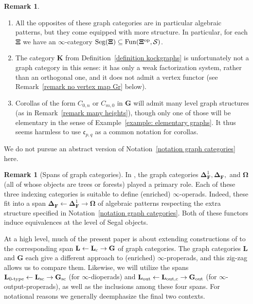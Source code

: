 \documentclass{amsart}
\numberwithin{theorem}{subsection}
\theoremstyle{definition}
\newtheorem{remark}[theorem]{Remark}
\providecommand{\op}{\mathrm{op}}
\newcommand{\xFun}{\operatorname{Fun}}
\newcommand{\finsetskel}{\mathbf{F}}
\newcommand{\xS}{\mathcal{S}}
\newcommand{\xfc}{\mathfrak{c}}
\newcommand{\icat}{$\infty$-category}
\newcommand{\name}[1]{\ensuremath{\text{\textup{#1}}}}
\newcommand{\simp}{\mathbf{\Delta}}
\newcommand{\bbO}{\mathbf{\Omega}}
\newcommand{\levelg}{\mathbf{L}}
\newcommand{\levelgconn}{\levelg_{\name{c}}}
\newcommand{\bbY}{\mathbf{G}}
\newcommand{\gc}{\mathbf{\Xi}}
\newcommand{\kockgraphs}{\mathbf{K}}
\newcommand{\Seg}{\name{Seg}}
\begin{document}
\begin{remark}\label{rem algpattvariation} \quad
	\begin{enumerate}[label=(\roman*), ref={\roman*}]
		\item All the opposites of these graph categories are in particular algebraic patterns, but they come equipped with more structure.
		In particular, for each $\gc$ we have an \icat{} $\Seg(\gc) \subseteq \xFun(\gc^\op, \xS)$. 
		\label{rem algpattvariation more structure}
	\item The category $\kockgraphs$ from Definition~\ref{definition kockgraphs} is unfortunately not a graph category in this sense: it has only a weak factorization system, rather than an orthogonal one, and it does not admit a vertex functor (see Remark~\ref{remark no vertex map Gr} below).
	\item Corollas of the form $C_{0,n}$ or $C_{m,0}$ in $\bbY$ will admit many level graph structures (as in Remark~\ref{remark many heights}), though only one of those will be elementary in the sense of Example~\ref{example: elementary graphs}.
	It thus seems harmless to use $\xfc_{p,q}$ as a common notation for corollas.
	\end{enumerate}
\end{remark}

We do not pursue an abstract version of Notation~\ref{notation graph categories} here.

\begin{remark}[Spans of graph categories]\label{remark three contexts}
In \cite{ChuHaugseng}, the graph categories $\simp_{\finsetskel}^1, \simp_{\finsetskel},$ and $\bbO$ (all of whose objects are trees or forests) played a primary role.
Each of these three indexing categories is suitable to define (enriched) $\infty$-operads.
Indeed, these fit into a span $\simp_{\finsetskel} \leftarrow \simp_{\finsetskel}^1 \rightarrow \bbO$ of algebraic patterns respecting the extra structure specified in Notation~\ref{notation graph categories}.
Both of these functors induce equivalences at the level of Segal objects.

At a high level, much of the present paper is about extending constructions of \cite{ChuHaugseng} to the corresponding span $\levelg \leftarrow \levelgconn \rightarrow \bbY$ of graph categories.
The graph categories $\levelg$ and $\bbY$ each give a different approach to (enriched) $\infty$-properads, and this zig-zag allows us to compare them.
Likewise, we will utilize the spans $\levelg_{\name{0-type}} \leftarrow \levelg_{\name{sc}} \rightarrow \bbY_{\name{sc}}$ (for $\infty$-dioperads) and $\levelg_{\name{out}} \leftarrow \levelg_{\name{out,c}} \rightarrow \bbY_{\name{out}}$ (for $\infty$-output-properads), as well as the inclusions among these four spans.
For notational reasons we generally deemphasize the final two contexts.
\end{remark}
\end{document}
